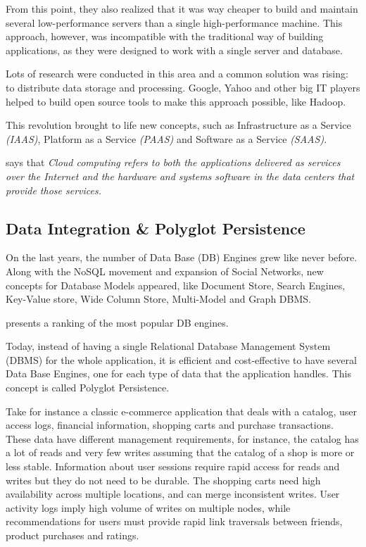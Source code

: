 \documentclass{article}
\begin{document}
From this point, they also realized that it was way cheaper to build and maintain several low-performance servers than a single high-performance machine. This approach, however, was incompatible with the traditional way of building applications, as they were designed to work with a single server and database. 

Lots of research were conducted in this area and a common solution was rising: to distribute data storage and processing. Google, Yahoo and other big IT players helped to build open source tools to make this approach possible, like Hadoop.

This revolution brought to life new concepts, such as Infrastructure as a Service \textit{(IAAS)}, Platform as a Service \textit{(PAAS)} and Software as a Service \textit{(SAAS)}. 

\cite{AViewOfCloudComputing} says that \textit{Cloud computing refers to both the applications delivered as services over the Internet and the hardware and systems software in the data centers that provide those services.} 



\subsection{Data Integration \& Polyglot Persistence}
On the last years, the number of Data Base (DB) Engines grew like never before. Along with the NoSQL movement and expansion of Social Networks, new concepts for Database Models appeared, like Document Store, Search Engines, Key-Value store, Wide Column Store, Multi-Model and Graph DBMS. 

\cite{dbranking} presents a ranking of the most popular DB engines.


Today, instead of having a single Relational Database Management System (DBMS) for the whole application, it is efficient and cost-effective to have several Data Base Engines, one for each type of data that the application handles. This concept is called Polyglot Persistence.


Take for instance a classic e-commerce application that deals with a catalog, user access logs, financial information, shopping carts and purchase transactions. These data have different management requirements, for instance, the catalog has a lot of reads and very few writes assuming that the catalog of a shop is more or less stable. Information about user sessions require rapid access for reads and writes but they do not need to be durable. The shopping carts need high availability across multiple locations, and can merge inconsistent writes. User activity logs imply high volume of writes on multiple nodes, while recommendations for users must provide rapid link traversals between friends, product purchases and ratings. \cite{AdressingDataManagementCloud}
\end{document}
